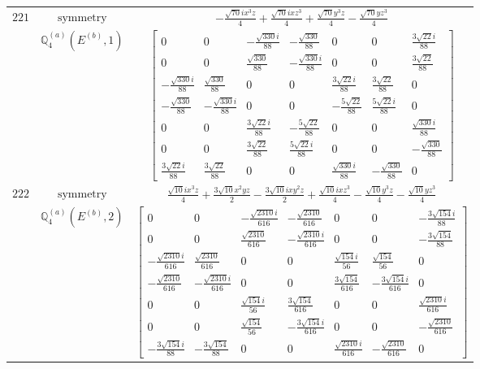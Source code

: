 \documentclass[fleqn,8pt,landscape]{jsarticle}
\begin{document}
\begin{longtable}{ccc}
$ 221 $ & $ \text{symmetry} $ & $ - \frac{\sqrt{70} i x^{3} z}{4} + \frac{\sqrt{70} i x z^{3}}{4} + \frac{\sqrt{70} y^{3} z}{4} - \frac{\sqrt{70} y z^{3}}{4} $ \\
$  $ & $ \mathbb{Q}_{4}^{(a)}(E^{(b)},1) $ & $ \begin{bmatrix} 0 & 0 & - \frac{\sqrt{330} i}{88} & - \frac{\sqrt{330}}{88} & 0 & 0 & \frac{3 \sqrt{22} i}{88} \\ 0 & 0 & \frac{\sqrt{330}}{88} & - \frac{\sqrt{330} i}{88} & 0 & 0 & \frac{3 \sqrt{22}}{88} \\ - \frac{\sqrt{330} i}{88} & \frac{\sqrt{330}}{88} & 0 & 0 & \frac{3 \sqrt{22} i}{88} & \frac{3 \sqrt{22}}{88} & 0 \\ - \frac{\sqrt{330}}{88} & - \frac{\sqrt{330} i}{88} & 0 & 0 & - \frac{5 \sqrt{22}}{88} & \frac{5 \sqrt{22} i}{88} & 0 \\ 0 & 0 & \frac{3 \sqrt{22} i}{88} & - \frac{5 \sqrt{22}}{88} & 0 & 0 & \frac{\sqrt{330} i}{88} \\ 0 & 0 & \frac{3 \sqrt{22}}{88} & \frac{5 \sqrt{22} i}{88} & 0 & 0 & - \frac{\sqrt{330}}{88} \\ \frac{3 \sqrt{22} i}{88} & \frac{3 \sqrt{22}}{88} & 0 & 0 & \frac{\sqrt{330} i}{88} & - \frac{\sqrt{330}}{88} & 0 \end{bmatrix} $ \\ \hline
$ 222 $ & $ \text{symmetry} $ & $ \frac{\sqrt{10} i x^{3} z}{4} + \frac{3 \sqrt{10} x^{2} y z}{2} - \frac{3 \sqrt{10} i x y^{2} z}{2} + \frac{\sqrt{10} i x z^{3}}{4} - \frac{\sqrt{10} y^{3} z}{4} - \frac{\sqrt{10} y z^{3}}{4} $ \\
$  $ & $ \mathbb{Q}_{4}^{(a)}(E^{(b)},2) $ & $ \begin{bmatrix} 0 & 0 & - \frac{\sqrt{2310} i}{616} & - \frac{\sqrt{2310}}{616} & 0 & 0 & - \frac{3 \sqrt{154} i}{88} \\ 0 & 0 & \frac{\sqrt{2310}}{616} & - \frac{\sqrt{2310} i}{616} & 0 & 0 & - \frac{3 \sqrt{154}}{88} \\ - \frac{\sqrt{2310} i}{616} & \frac{\sqrt{2310}}{616} & 0 & 0 & \frac{\sqrt{154} i}{56} & \frac{\sqrt{154}}{56} & 0 \\ - \frac{\sqrt{2310}}{616} & - \frac{\sqrt{2310} i}{616} & 0 & 0 & \frac{3 \sqrt{154}}{616} & - \frac{3 \sqrt{154} i}{616} & 0 \\ 0 & 0 & \frac{\sqrt{154} i}{56} & \frac{3 \sqrt{154}}{616} & 0 & 0 & \frac{\sqrt{2310} i}{616} \\ 0 & 0 & \frac{\sqrt{154}}{56} & - \frac{3 \sqrt{154} i}{616} & 0 & 0 & - \frac{\sqrt{2310}}{616} \\ - \frac{3 \sqrt{154} i}{88} & - \frac{3 \sqrt{154}}{88} & 0 & 0 & \frac{\sqrt{2310} i}{616} & - \frac{\sqrt{2310}}{616} & 0 \end{bmatrix} $ \\ \hline

\end{longtable}
\end{document}
